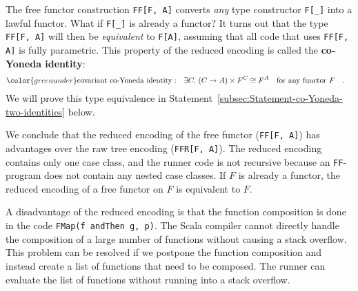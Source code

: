 The free functor construction \lstinline!FF[F, A]!
converts \emph{any} type constructor \lstinline!F[_]!
into a lawful functor. What if \lstinline!F[_]!
is already a functor? It turns out that the type \lstinline!FF[F, A]!
will then be \emph{equivalent} to \lstinline!F[A]!,
assuming that all code that uses \lstinline!FF[F, A]!
is fully parametric. This property of the reduced encoding is called
the \textbf{co-Yoneda identity}:
\begin{align*}
{\color{greenunder}\text{covariant co-Yoneda identity}:}\quad & \exists C.\,\left(C\rightarrow A\right)\times F^{C}\cong F^{A}\quad\text{for any functor }F\quad.
\end{align*}
We will prove this type equivalence in Statement~\ref{subsec:Statement-co-Yoneda-two-identities}
below. 

We conclude that the reduced encoding of the free functor (\lstinline!FF[F, A]!)
has advantages over the raw tree encoding (\lstinline!FFR[F, A]!).
The reduced encoding contains only one case class, and the runner
code is not recursive because an \lstinline!FF!-program
does not contain any nested case classes. If $F$ is already a functor,
the reduced encoding of a free functor on $F$ is equivalent to $F$.

A disadvantage of the reduced encoding is that the function composition
is done in the code \lstinline!FMap(f andThen g, p)!.
The Scala compiler cannot directly handle the composition of a large
number of functions without causing a stack overflow. This problem
can be resolved if we postpone the function composition and instead
create a list of functions that need to be composed. The runner can
evaluate the list of functions without running into a stack overflow.

